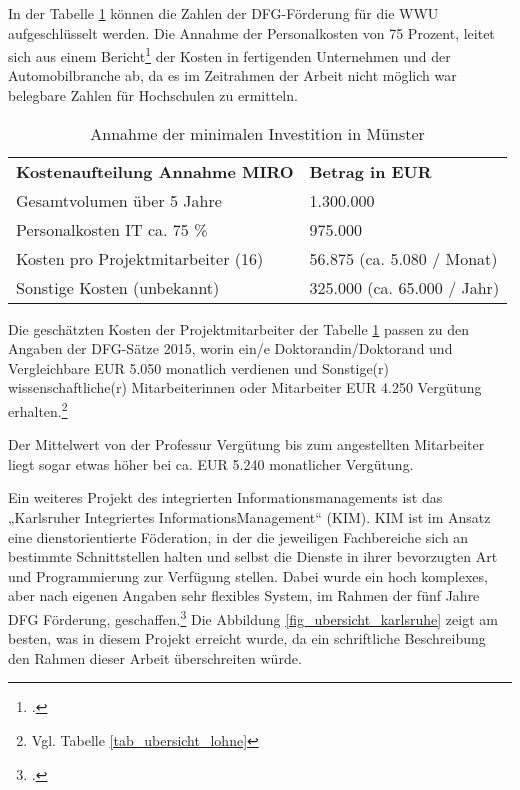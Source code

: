 In der Tabelle \ref{tab_minimale_investition_munster} können die Zahlen der DFG-Förderung für die WWU aufgeschlüsselt werden.
Die Annahme der Personalkosten von 75 Prozent, leitet sich aus einem Bericht\footcite{schuelein_2009} der Kosten in fertigenden Unternehmen und der Automobilbranche ab, da es im Zeitrahmen der Arbeit nicht möglich war belegbare Zahlen für Hochschulen zu ermitteln. 

\begin{table}[h!]
	\begin{tabularx}{\textwidth}{l|l}
		\hline
		\textbf{Kostenaufteilung Annahme MIRO} & \textbf{Betrag in EUR}\\
		Gesamtvolumen über 5 Jahre & 1.300.000\\
		Personalkosten IT ca. 75 \% & 975.000\\
		Kosten pro Projektmitarbeiter (16) & 56.875 (ca. 5.080 / Monat)\\ 
		Sonstige Kosten (unbekannt) & 325.000 (ca. 65.000 / Jahr)\\
		\hline
    \end{tabularx}
    \caption{Annahme der minimalen Investition in Münster}
    \label{tab_minimale_investition_munster}
\end{table}

Die geschätzten Kosten der Projektmitarbeiter der Tabelle \ref{tab_minimale_investition_munster} passen zu den Angaben der DFG-Sätze 2015, worin ein/e Doktorandin/Doktorand und Vergleichbare EUR 5.050 monatlich verdienen und Sonstige(r) wissenschaftliche(r) Mitarbeiterinnen oder Mitarbeiter EUR 4.250 Vergütung erhalten.\footnote{Vgl. Tabelle \ref{tab_ubersicht_lohne}} 


Der Mittelwert von der Professur Vergütung bis zum angestellten Mitarbeiter liegt sogar etwas höher bei ca. EUR 5.240 monatlicher Vergütung.

Ein weiteres Projekt des integrierten Informationsmanagements ist das „Karlsruher Integriertes InformationsManagement“ (KIM).
KIM ist im Ansatz eine dienstorientierte Föderation, in der die jeweiligen Fachbereiche sich an bestimmte Schnittstellen 
halten und selbst die Dienste in ihrer bevorzugten Art und Programmierung zur Verfügung stellen. Dabei wurde ein hoch komplexes, aber nach eigenen Angaben sehr flexibles System, im Rahmen der fünf Jahre DFG Förderung, geschaffen.\footcite{bode_informationsmanagement_2010}
Die Abbildung \ref{fig_ubersicht_karlsruhe} zeigt am besten, was in diesem Projekt erreicht wurde, da ein schriftliche Beschreibung den Rahmen dieser Arbeit überschreiten würde.

